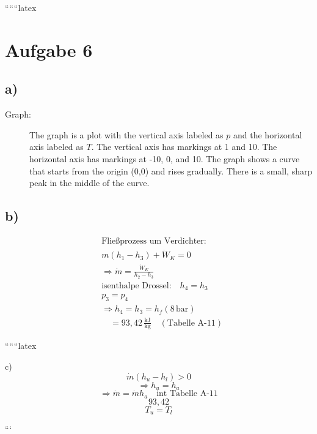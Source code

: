 
``````latex


\section*{Aufgabe 6}

\subsection*{a)}

\begin{description}
    \item[Graph:] The graph is a plot with the vertical axis labeled as \( p \) and the horizontal axis labeled as \( T \). The vertical axis has markings at 1 and 10. The horizontal axis has markings at -10, 0, and 10. The graph shows a curve that starts from the origin (0,0) and rises gradually. There is a small, sharp peak in the middle of the curve.
\end{description}

\subsection*{b)}

\begin{align*}
    &\text{Fließprozess um Verdichter:} \\
    &m (h_1 - h_3) + \dot{W}_K = 0 \\
    &\Rightarrow \dot{m} = \frac{\dot{W}_K}{h_2 - h_3} \\
    &\text{isenthalpe Drossel:} \quad h_4 = h_3 \\
    &p_3 = p_4 \\
    &\Rightarrow h_4 = h_3 = h_f (8 \, \text{bar}) \\
    &\quad = 93,42 \, \frac{\text{kJ}}{\text{kg}} \quad (\text{Tabelle A-11})
\end{align*}

``````latex


c)
\[
\dot{m} (h_u - h_l) > 0
\]
\[
\Rightarrow h_u = h_a
\]
\[
\Rightarrow \dot{m} = \dot{m} h_a \quad \text{int Tabelle A-11}
\]
\[
93,42
\]
\[
T_u = T_l
\]

```